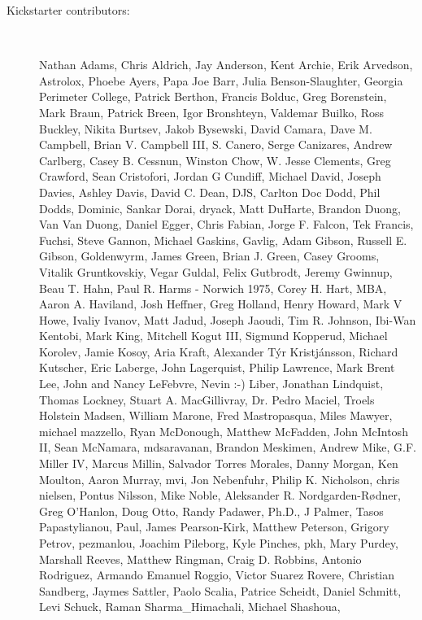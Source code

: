 \documentclass[11pt,final]{book}
\begin{document}
\begin{description}
\begin{itemize}
\end{itemize}

 \item[Kickstarter contributors:] ~  
 
Nathan Adams,
Chris Aldrich,
Jay Anderson,
Kent Archie,
Erik Arvedson,
Astrolox,
Phoebe Ayers,
Papa Joe Barr,
Julia Benson-Slaughter, Georgia Perimeter College,
Patrick Berthon,
Francis Bolduc,
Greg Borenstein,
Mark Braun,
Patrick Breen,
Igor Bronshteyn,
Valdemar Buil\-ko,
Ross Buckley,
Nikita Burtsev,
Jakob Bysewski,
David Camara,
Dave M. Campbell,
Brian V. Campbell III,
S. Canero,
Serge Canizares,
Andrew Carlberg,
Casey B. Cessnun,
Winston Chow,
W. Jesse Clements,
Greg Crawford,
Sean Cristofori,
Jordan G Cundiff,
Michael David,
Joseph Davies,
Ashley Davis,
David C. Dean,
DJS,
Carlton Doc Dodd,
Phil Dodds,
Dominic,
Sankar Dorai,
dryack,
Matt DuHarte,
Brandon Duong,
Van Van Duong,
Daniel Egger,
Chris Fabian,
Jorge F. Falcon,
Tek Francis,
Fuchsi,
Steve Gannon,
Michael Gaskins,
Gavlig,
Adam Gibson,
Russell E. Gibson,
Goldenwyrm,
James Green,
Brian J. Green,
Casey Grooms,
Vitalik Gruntkovskiy,
Vegar Guldal,
Felix Gutbrodt,
Jeremy Gwinnup,
Beau T. Hahn,
Paul R. Harms - Norwich 1975,
Corey H. Hart, MBA,
Aaron A. Haviland,
Josh Heffner,
Greg Holland,
Henry Howard,
Mark V Howe,
Ivaliy Ivanov,
Matt Jadud,
Joseph Jaoudi,
Tim R. Johnson,
Ibi-Wan Kentobi,
Mark King,
Mitchell Kogut III,
Sigmund Kopperud,
Michael Korolev,
Jamie Kosoy,
Aria Kraft,
Alexander T{\'{y}}r Kristj{\'{a}}nsson,
Richard Kutscher,
Eric Laberge,
John Lagerquist,
Philip Lawrence,
Mark Brent Lee,
John and Nancy LeFebvre,
Nevin :-) Liber,
Jonathan Lindquist,
Thomas Lockney,
Stuart A. MacGillivray,
Dr. Pedro Maciel,
Troels Holstein Madsen,
William Marone,
Fred Mastropasqua,
Miles Mawyer,
michael mazzello,
Ryan McDonough,
Matthew McFadden,
John McIntosh II,
Sean McNamara,
mdsaravanan,
Brandon Meskimen,
Andrew Mike,
G.F. Miller IV,
Marcus Millin,
Salvador Torres Morales,
Danny Morgan,
Ken Moulton,
Aaron Murray,
mvi,
Jon Nebenfuhr,
Philip K. Nicholson,
chris nielsen,
Pontus Nilsson,
Mike Noble,
Aleksander R. Nord\-gar\-den-R{\o}d\-ner,
Greg O'Han\-lon,
Doug Otto,
Randy Padawer, Ph.D.,
J Palmer,
Tasos Papastylianou,
Paul,
James Pearson-Kirk,
Matthew Peterson,
Grigory Petrov,
pezmanlou,
Joachim Pileborg,
Kyle Pinches,
pkh,
Mary Purdey,
Marshall Reeves,
Matthew Ringman,
Craig D. Robbins,
Antonio Rodriguez,
Armando Emanuel Roggio,
Victor Suarez Rovere,
Christian Sandberg,
Jaymes Sattler,
Paolo Scalia,
Patrice Scheidt,
Daniel Schmitt,
Levi Schuck,
Raman Sharma\_Himachali,
Michael Shashoua,

\end{description}
\end{document}
